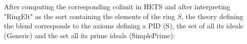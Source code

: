 


		



 
 


After computing the corresponding colimit in HETS and after
interpreting "RingElt" as the sort containing the elements of the ring
$S$, the theory defining the blend corresponds to the axioms defining
a PID (S), the set of all its ideals (Generic) and the set all its
prime ideals (SimplePrime):





